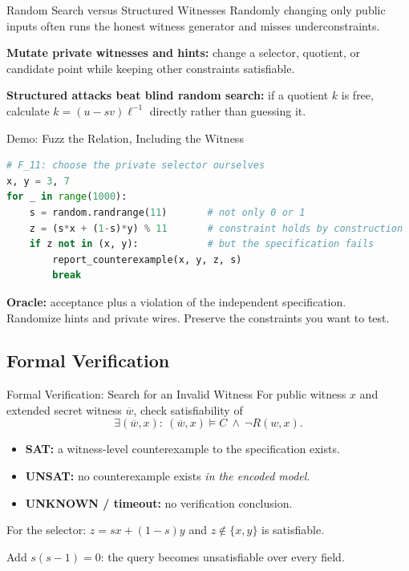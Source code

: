 \documentclass[aspectratio=169,11pt]{beamer}
\begin{document}
\begin{frame}{Random Search versus Structured Witnesses}
Randomly changing only public inputs often runs the honest witness generator and misses underconstraints.
\vspace{3mm}

\textbf{Mutate private witnesses and hints:} change a selector, quotient, or candidate point while keeping other constraints satisfiable.
\vspace{3mm}

\textbf{Structured attacks beat blind random search:} if a quotient $k$ is free, calculate $k=(u-sv)\ell^{-1}$ directly rather than guessing it.
\end{frame}

\begin{frame}[fragile]{Demo: Fuzz the Relation, Including the Witness}
\begin{lstlisting}[language=Python]
# F_11: choose the private selector ourselves
x, y = 3, 7
for _ in range(1000):
    s = random.randrange(11)       # not only 0 or 1
    z = (s*x + (1-s)*y) % 11       # constraint holds by construction
    if z not in (x, y):            # but the specification fails
        report_counterexample(x, y, z, s)
        break
\end{lstlisting}
\textbf{Oracle:} acceptance plus a violation of the independent specification.\\[2mm]
Randomize hints and private wires. Preserve the constraints you want to test.
\end{frame}

\subsection{Formal Verification}
\begin{frame}{Formal Verification: Search for an Invalid Witness}
For public witness $x$ and extended secret witness $\overline w$, check satisfiability of
\[\boxed{\exists (\overline w, x):\ (\overline w, x) \vDash C \ \land\ \neg R(w, x).}\]
\begin{itemize}
\item \textbf{SAT:} a witness-level counterexample to the specification exists.
\item \textbf{UNSAT:} no counterexample exists \emph{in the encoded model}.
\item \textbf{UNKNOWN / timeout:} no verification conclusion.
\end{itemize}
\vspace{1mm}
For the selector: $z=sx+(1-s)y$ and $z\notin\{x,y\}$ is satisfiable. 
\pause

Add $s(s-1)=0$: the query becomes unsatisfiable over every field.
\end{frame}
\end{document}
